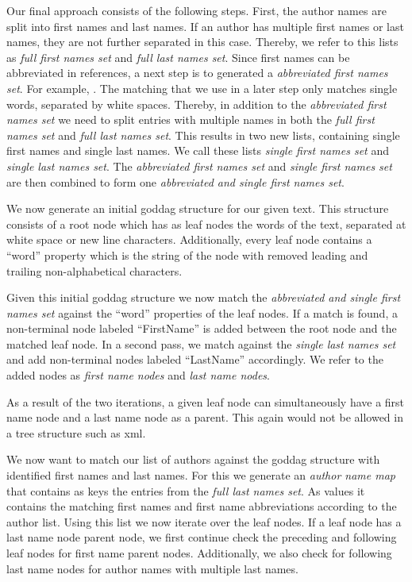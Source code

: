 Our final approach consists of the following steps.
First, the author names are split into first names and last names.
If an author has multiple first names or last names, they are not further separated in this case.
Thereby, we refer to this lists as \textit{full first names set} and \textit{full last names set}.
Since first names can be abbreviated in references, a next step is to generated a \textit{abbreviated first names set}.
For example, .
The matching that we use in a later step only matches single words, separated by white spaces.
Thereby, in addition to the \textit{abbreviated first names set} we need to split entries with multiple names in both the \textit{full first names set} and \textit{full last names set}.
This results in two new lists, containing single first names and single last names.
We call these lists \textit{single first names set} and \textit{single last names set}.
The \textit{abbreviated first names set} and \textit{single first names set} are then combined to form one \textit{abbreviated and single first names set}.

We now generate an initial \gls{goddag} structure for our given text.
This structure consists of a root node which has as leaf nodes the words of the text, separated at white space or new line characters.
Additionally, every leaf node contains a ``word'' property which is the string of the node with removed leading and trailing non-alphabetical characters.

Given this initial \gls{goddag} structure we now match the \textit{abbreviated and single first names set} against the ``word'' properties of the leaf nodes.
If a match is found, a non-terminal node labeled ``FirstName'' is added between the root node and the matched leaf node.
In a second pass, we match against the \textit{single last names set} and add non-terminal nodes labeled ``LastName'' accordingly.
We refer to the added nodes as \textit{first name nodes} and \textit{last name nodes}.

As a result of the two iterations, a given leaf node can simultaneously have a first name node and a last name node as a parent.
This again would not be allowed in a tree structure such as \gls{xml}.

We now want to match our list of authors against the \gls{goddag} structure with identified first names and last names.
For this we generate an \textit{author name map} that contains as keys the entries from the \textit{full last names set}.
As values it contains the matching first names and first name abbreviations according to the author list.
Using this list we now iterate over the leaf nodes.
If a leaf node has a last name node parent node, we first continue check the preceding and following leaf nodes for first name parent nodes.
Additionally, we also check for following last name nodes for author names with multiple last names.

